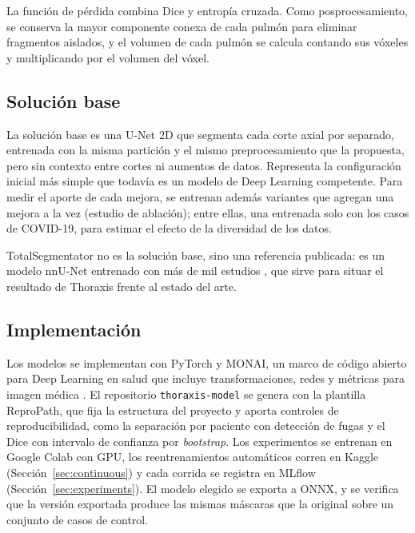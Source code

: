 La función de pérdida combina Dice y entropía cruzada. Como posprocesamiento,
se conserva la mayor componente conexa de cada pulmón para eliminar
fragmentos aislados, y el volumen de cada pulmón se calcula contando sus
vóxeles y multiplicando por el volumen del vóxel.

\subsection{Solución base}\label{sec:baseline}
La solución base es una U-Net 2D que segmenta cada corte axial por separado,
entrenada con la misma partición y el mismo preprocesamiento que la propuesta,
pero sin contexto entre cortes ni aumentos de datos. Representa la
configuración inicial más simple que todavía es un modelo de Deep Learning
competente. Para medir el aporte de cada mejora, se entrenan además variantes
que agregan una mejora a la vez (estudio de ablación); entre ellas, una
entrenada solo con los casos de COVID-19, para estimar el efecto de la
diversidad de los datos.

TotalSegmentator no es la solución base, sino una referencia publicada: es un
modelo nnU-Net entrenado con más de mil estudios \parencite{wasserthal2023},
que sirve para situar el resultado de Thoraxis frente al estado del arte.

\subsection{Implementación}\label{sec:implementation}
Los modelos se implementan con PyTorch y MONAI, un marco de código abierto
para Deep Learning en salud que incluye transformaciones, redes y métricas
para imagen médica \parencite{cardoso2022}. El repositorio
\texttt{thoraxis-model} se genera con la plantilla ReproPath, que fija la
estructura del proyecto y aporta controles de reproducibilidad, como la
separación por paciente con detección de fugas y el Dice con intervalo de
confianza por \textit{bootstrap}. Los experimentos se
entrenan en Google Colab con GPU, los reentrenamientos automáticos corren en
Kaggle (Sección~\ref{sec:continuous}) y cada corrida se registra en MLflow
(Sección~\ref{sec:experiments}). El modelo elegido se exporta a ONNX, y se
verifica que la versión exportada produce las mismas máscaras que la original
sobre un conjunto de casos de control.


